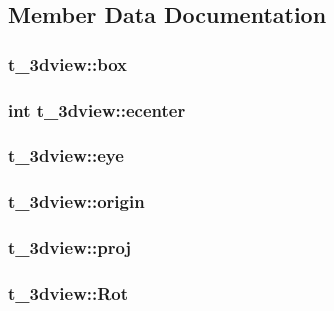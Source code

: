 \subsection{\-Member \-Data \-Documentation}
\hypertarget{structt__3dview_a0789fb84f78e6bd29efdd835d676f645}{
\subsubsection[{box}]{ {\bf t\-\_\-3dview\-::box}}}\label{structt__3dview_a0789fb84f78e6bd29efdd835d676f645}
\hypertarget{structt__3dview_a9d92a4c4db66717381a7eccc97a5998a}{
\subsubsection[{ecenter}]{\setlength{\rightskip}{0pt plus 5cm}int {\bf t\-\_\-3dview\-::ecenter}}}\label{structt__3dview_a9d92a4c4db66717381a7eccc97a5998a}
\hypertarget{structt__3dview_a5a8cd754828a61c121679ab62b1be705}{
\subsubsection[{eye}]{ {\bf t\-\_\-3dview\-::eye}}}\label{structt__3dview_a5a8cd754828a61c121679ab62b1be705}
\hypertarget{structt__3dview_a732fc76b2ee7c749c73e5a969d0aaf12}{
\subsubsection[{origin}]{ {\bf t\-\_\-3dview\-::origin}}}\label{structt__3dview_a732fc76b2ee7c749c73e5a969d0aaf12}
\hypertarget{structt__3dview_aec5401c7addc72b02a13df26ac0097f9}{
\subsubsection[{proj}]{ {\bf t\-\_\-3dview\-::proj}}}\label{structt__3dview_aec5401c7addc72b02a13df26ac0097f9}
\hypertarget{structt__3dview_a3e18088471be49813b6407f4892e3662}{
\subsubsection[{\-Rot}]{ {\bf t\-\_\-3dview\-::\-Rot}}}\label{structt__3dview_a3e18088471be49813b6407f4892e3662}
